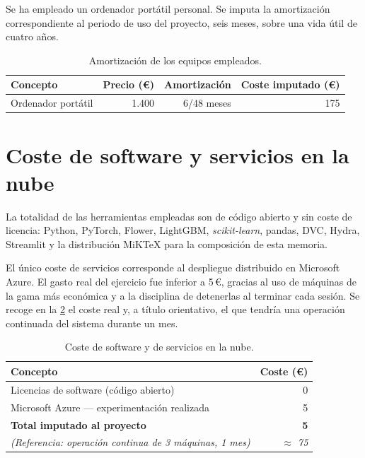 Se ha empleado un ordenador portátil personal. Se imputa la amortización correspondiente al periodo
de uso del proyecto, seis meses, sobre una vida útil de cuatro años.

\begin{table}[H]
  \centering
  \caption[Coste de equipos]{Amortización de los equipos empleados.}
  \label{tab:presupuesto_equipos}
  \begin{tabular}{lrrr}
    \toprule
    Concepto & Precio (€) & Amortización & Coste imputado (€) \\
    \midrule
    Ordenador portátil & 1.400 & 6/48 meses & 175 \\
    \bottomrule
  \end{tabular}
\end{table}

\section{Coste de software y servicios en la nube}

La totalidad de las herramientas empleadas son de código abierto y sin coste de licencia: Python,
PyTorch, Flower, LightGBM, \emph{scikit-learn}, pandas, DVC, Hydra, Streamlit y la distribución
MiKTeX para la composición de esta memoria.

El único coste de servicios corresponde al despliegue distribuido en Microsoft Azure. El gasto real
del ejercicio fue inferior a 5\,€, gracias al uso de máquinas de la gama más económica y a la
disciplina de detenerlas al terminar cada sesión. Se recoge en la
\cref{tab:presupuesto_software} el coste real y, a título orientativo, el que tendría una
operación continuada del sistema durante un mes.

\begin{table}[H]
  \centering
  \caption[Coste de software y servicios]{Coste de software y de servicios en la nube.}
  \label{tab:presupuesto_software}
  \begin{tabular}{lr}
    \toprule
    Concepto & Coste (€) \\
    \midrule
    Licencias de software (código abierto) & 0 \\
    Microsoft Azure — experimentación realizada & 5 \\
    \midrule
    \textbf{Total imputado al proyecto} & \textbf{5} \\
    \addlinespace
    \emph{(Referencia: operación continua de 3 máquinas, 1 mes)} & \emph{$\approx$ 75} \\
    \bottomrule
  \end{tabular}
\end{table}

